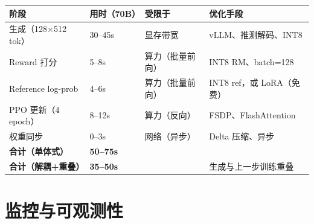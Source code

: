 \noindent\begin{tabularx}{\linewidth}{@{}Z{0.8} Z{0.55} Z{0.65} Z{2}@{}}
\toprule
\textbf{阶段} & \textbf{用时（70B）} & \textbf{受限于} & \textbf{优化手段} \\
\midrule
生成（128$\times$512 tok） & 30--45s & 显存带宽 & vLLM、推测解码、INT8 \\
Reward 打分 & 5--8s & 算力（批量前向） & INT8 RM、batch=128 \\
Reference log-prob & 4--6s & 算力（批量前向） & INT8 ref，或 LoRA（免费） \\
PPO 更新（4 epoch） & 8--12s & 算力（反向） & FSDP、FlashAttention \\
权重同步 & 0--3s & 网络（异步） & Delta 压缩、异步 \\
\textbf{合计（单体式）} & \textbf{50--75s} &  &  \\
\textbf{合计（解耦+重叠）} & \textbf{35--50s} &  & 生成与上一步训练重叠 \\
\bottomrule
\end{tabularx}

\section{监控与可观测性}
\label{monitoring-and-observability}

